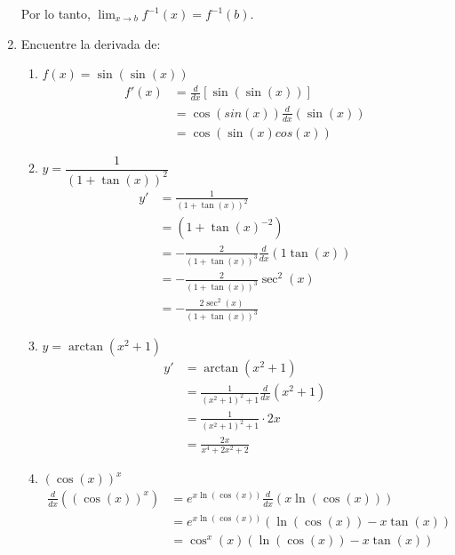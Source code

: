\documentclass{report}
\begin{document}
\begin{enumerate}
        Por lo tanto, $\lim_{x \to b} f^{-1}(x) = f^{-1}(b)$.

        \item Encuentre la derivada de:

        \begin{enumerate}[label=\alph*)]
            \item $f(x) = \sin(\sin(x))$
            \begin{align*}
                f'(x) &= \frac{d}{dx}[\sin(\sin(x))] \\
                &= \cos(sin(x))\frac{d}{dx}(\sin(x)) \\
                &= \cos(\sin(x)cos(x))
                \end{align*}

            \item $y = \dfrac{1}{(1 + \tan(x))^2}$
            \begin{align*}
                y' &= \frac{1}{(1 + \tan(x))^2} \\
                &= (1 + \tan(x)^{-2}) \\
                &= -\frac{2}{(1 + \tan(x))^3} \frac{d}{dx}(1\tan(x)) \\
                &= -\frac{2}{(1 + \tan(x))^3} \sec^2(x) \\
                &= -\frac{2\sec^2(x)}{(1 + \tan(x))^3}
            \end{align*}

            \item $y = \arctan(x^2 + 1)$
            \begin{align*}
                y' &= \arctan(x^2 + 1) \\
                &= \frac{1}{(x^2 + 1)^2 + 1} \frac{d}{dx}(x^2 + 1) \\
                &= \frac{1}{(x^2 + 1)^2 + 1} \cdot 2x \\
                &= \frac{2x}{x^4 + 2x^2 + 2}
            \end{align*}
            \item $(\cos(x))^x$
            \begin{align*}
                \frac{d}{dx}((\cos(x))^x) &= e^{x\ln(\cos(x))} \frac{d}{dx}(x\ln(\cos(x))) \\
                &= e^{x\ln(\cos(x))}(\ln(\cos(x)) - x\tan(x)) \\
                &= \cos^x(x)(\ln(\cos(x)) - x\tan(x))
            \end{align*}
        \end{enumerate}


\end{enumerate}
\end{document}
